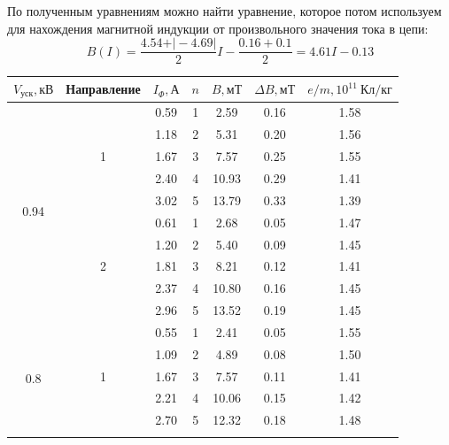 \documentclass[a4paper, 12pt]{article}
\begin{document}
По полученным уравнениям можно найти уравнение, которое потом используем для нахождения магнитной индукции от произвольного значения тока в цепи:$$B(I) = \dfrac{4.54 + \vert -4.69 \vert}{2}I - \dfrac{0.16 + 0.1}{2} = 4.61I-0.13$$

\begin{table}[H]
\centering
\begin{tabular}{|c|c|c|c|c|c|c|}
\hline
$V_{\text{уск}}, \text{кВ}$                     & Направление        & $I_{\Phi}, \text{А}$   & $n$ & $B, \text{мТ}$     & $\Delta B, \text{мТ}$   & $e/m, 10^{11} \: \text{Кл/кг}$        \\ \hline
\multirow{10}{*}{0.94} & \multirow{5}{*}{1} & 0.59 & 1 & 2.59   & 0.16 & 1.58 \\ \cline{3-7} 
                       &                    & 1.18 & 2 & 5.31   & 0.20 & 1.56 \\ \cline{3-7} 
                       &                    & 1.67 & 3 & 7.57   & 0.25 & 1.55 \\ \cline{3-7} 
                       &                    & 2.40 & 4 & 10.93  & 0.29 & 1.41 \\ \cline{3-7} 
                       &                    & 3.02 & 5 & 13.79  & 0.33 & 1.39 \\ \cline{2-7} 
                       & \multirow{5}{*}{2} & 0.61 & 1 & 2.68  & 0.05 & 1.47 \\ \cline{3-7} 
                       &                    & 1.20 & 2 & 5.40  & 0.09 & 1.45 \\ \cline{3-7} 
                       &                    & 1.81 & 3 & 8.21  & 0.12 & 1.41 \\ \cline{3-7} 
                       &                    & 2.37 & 4 & 10.80 & 0.16 & 1.45 \\ \cline{3-7} 
                       &                    & 2.96 & 5 & 13.52 & 0.19 & 1.45 \\ \hline
\multirow{11}{*}{0.8}  & \multirow{5}{*}{1} & 0.55 & 1 & 2.41  & 0.05 & 1.55 \\ \cline{3-7} 
                       &                    & 1.09 & 2 & 4.89  & 0.08 & 1.50 \\ \cline{3-7} 
                       &                    & 1.67 & 3 & 7.57  & 0.11 & 1.41 \\ \cline{3-7} 
                       &                    & 2.21 & 4 & 10.06 & 0.15 & 1.42 \\ \cline{3-7} 
                       &                    & 2.70 & 5 & 12.32 & 0.18 & 1.48 \\ \cline{2-7} 

\end{tabular}
\end{table}
\end{document}
